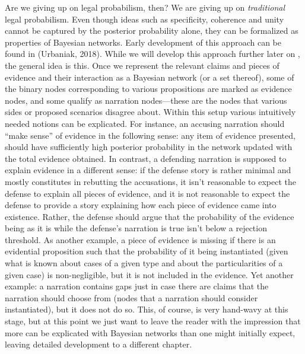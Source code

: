 \documentclass[
  10pt,
  dvipsnames,enabledeprecatedfontcommands]{scrartcl}
\begin{document}
Are we giving up on legal probabilism, then? We are giving up on
\emph{traditional} legal probabilism. Even though ideas such as
specificity, coherence and unity cannot be captured by the posterior
probability alone, they can be formalized as properties of Bayesian
networks. Early development of this approach can be found in (Urbaniak,
2018). While we will develop this approach further later on
, the general idea is this. Once we represent the
relevant claims and pieces of evidence and their interaction as a
Bayesian network (or a set thereof), some of the binary nodes
corresponding to various propositions are marked as evidence nodes, and
some qualify as narration nodes---these are the nodes that various sides
or proposed scenarios disagree about. Within this setup various
intuitively needed notions can be explicated. For instance, an accusing
narration should ``make sense'' of evidence in the following sense: any
item of evidence presented, should have sufficiently high posterior
probability in the network updated with the total evidence obtained. In
contrast, a defending narration is supposed to explain evidence in a
different sense: if the defense story is rather minimal and mostly
constitutes in rebutting the accusations, it isn't reasonable to expect
the defense to explain all pieces of evidence, and it is not reasonable
to expect the defense to provide a story explaining how each piece of
evidence came into existence. Rather, the defense should argue that the
probability of the evidence being as it is while the defense's narration
is true isn't below a rejection threshold. As another example, a piece
of evidence is missing if there is an evidential proposition such that
the probability of it being instantiated (given what is known about
cases of a given type and about the particularities of a given case) is
non-negligible, but it is not included in the evidence. Yet another
example: a narration contains gaps just in case there are claims that
the narration should choose from (nodes that a narration should consider
instantiated), but it does not do so. This, of course, is very hand-wavy
at this stage, but at this point we just want to leave the reader with
the impression that more can be explicated with Bayesian networks than
one might initially expect, leaving detailed development to a different
chapter. 
\end{document}
